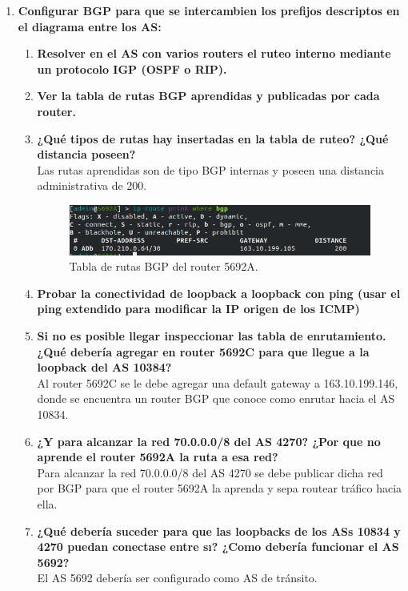 \documentclass[letterpaper,12pt]{article}
\begin{document}
\begin{enumerate}
		\item \textbf{Configurar BGP para que se intercambien los prefijos descriptos en el diagrama entre los AS:}
		\begin{enumerate}
			\item \textbf{Resolver en el AS con varios routers el ruteo interno mediante un protocolo IGP (OSPF o RIP).}
			\item \textbf{Ver la tabla de rutas BGP aprendidas y publicadas por cada router.}
			\item \textbf{¿Qué tipos de rutas hay insertadas en la tabla de ruteo? ¿Qué distancia poseen?}\\
			Las rutas aprendidas son de tipo BGP internas y poseen una distancia administrativa de 200.
			
			\begin{figure}[H]
				\centering \includegraphics[width=1\columnwidth]{figure/bgp-route.png}
				\caption{
					\label{fig:samplesetup} %
					Tabla de rutas BGP del router 5692A.
				}
			\end{figure}
			
			\item \textbf{Probar la conectividad de loopback a loopback con ping (usar el ping extendido para modificar la IP origen de los ICMP)}
			\item \textbf{Si no es posible llegar inspeccionar las tabla de enrutamiento. ¿Qué debería agregar en router 5692C para que llegue a la loopback del AS 10384?}\\
			Al router 5692C se le debe agregar una default gateway a 163.10.199.146, donde se encuentra un router BGP que conoce como enrutar hacia el AS 10834.
			\item \textbf{¿Y para alcanzar la red 70.0.0.0/8 del AS 4270? ¿Por que no aprende el router 5692A la ruta a esa red?}\\
			Para alcanzar la red 70.0.0.0/8 del AS 4270 se debe publicar dicha red por BGP para que el router 5692A la aprenda y sepa routear tráfico hacia ella.
			\item \textbf{¿Qué debería suceder para que las loopbacks de los ASs 10834 y 4270 puedan conectase entre sı? ¿Como debería funcionar el AS 5692?}\\
			El AS 5692 debería ser configurado como AS de tránsito.
		\end{enumerate}
		

\end{enumerate}
\end{document}
